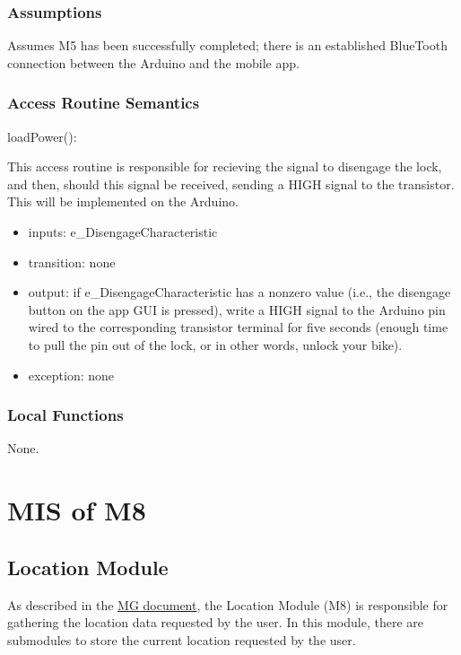 \documentclass[12pt, titlepage]{article}
\begin{document}
\subsubsection{Assumptions}

Assumes M5 has been successfully completed; there is an established BlueTooth connection between the Arduino and the mobile app.

\subsubsection{Access Routine Semantics}

\noindent loadPower():

This access routine is responsible for recieving the signal to disengage the lock, and then, should this signal be received, sending a HIGH signal to the transistor. This will be implemented on the Arduino. 

\begin{itemize}
\item inputs: e\_DisengageCharacteristic
\item transition: none 
\item output: if e\_DisengageCharacteristic has a nonzero value (i.e., the disengage button on the app GUI is pressed), write a HIGH signal to the Arduino pin wired to the corresponding transistor terminal for five seconds (enough time to pull the pin out of the lock, or in other words, unlock your bike). 
\item exception: none 
\end{itemize}

\subsubsection{Local Functions}

None.




\section{MIS of M8} \label{Location} 

\subsection{Location Module}

As described in the \href{https://github.com/NevoAbigail/Capstone/blob/main/docs/Design/SoftArchitecture/MG.pdf}{MG document}, the Location Module (M8) is responsible for gathering the location data requested by the user. In this module, there are submodules to store the current location requested by the user.
\end{document}
